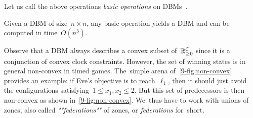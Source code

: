 Let us call the above operations \emph{basic operations} on DBMs~\cite{BY04}.
\begin{theorem}
\label{9-thm:complexity_basic_operations_DBMs}
  Given a DBM of size~$n\times n$, any basic operation yields a DBM
  and can be computed in time~$O(n^3)$.
\end{theorem}



Observe that a DBM always describes a convex subset
of~$\mathbb{R}_{\geq 0}^{\mathcal{C}}$ since it is a conjunction of convex clock
constraints. However, the set of winning states is in general
non-convex in timed games. The~simple arena
of~\cref{9-fig:non-convex} provides an example: if Eve's objective
is to reach~$\ell_1$, then it should just avoid the configurations
satisfying~$1\leq x_1,x_2\leq 2$. But this set of predecessors is then
non-convex as shown in~\cref{9-fig:non-convex}.
We~thus have to work with unions of zones, also called
\emph{""federations""} of zones, or \emph{federations} for~short.

